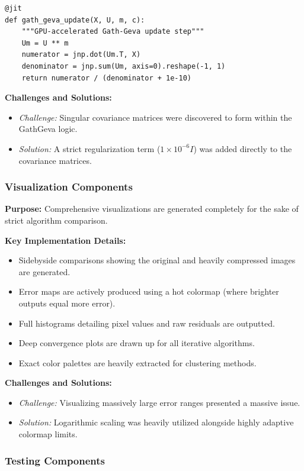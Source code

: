 \begin{verbatim}
@jit
def gath_geva_update(X, U, m, c):
    """GPU-accelerated Gath-Geva update step"""
    Um = U ** m
    numerator = jnp.dot(Um.T, X)
    denominator = jnp.sum(Um, axis=0).reshape(-1, 1)
    return numerator / (denominator + 1e-10)
\end{verbatim}

\textbf{Challenges and Solutions:}
\begin{itemize}
    \item \textit{Challenge:} Singular covariance matrices were discovered to form within the GathGeva logic.
    \item \textit{Solution:} A strict regularization term ($1\times10^{-6}I$) was added directly to the covariance matrices.
\end{itemize}

\subsubsection{Visualization Components}

\textbf{Purpose:} Comprehensive visualizations are generated completely for the sake of strict algorithm comparison.

\textbf{Key Implementation Details:}
\begin{itemize}
    \item Sidebyside comparisons showing the original and heavily compressed images are generated.
    \item Error maps are actively produced using a hot colormap (where brighter outputs equal more error).
    \item Full histograms detailing pixel values and raw residuals are outputted.
    \item Deep convergence plots are drawn up for all iterative algorithms.
    \item Exact color palettes are heavily extracted for clustering methods.
\end{itemize}

\textbf{Challenges and Solutions:}
\begin{itemize}
    \item \textit{Challenge:} Visualizing massively large error ranges presented a massive issue.
    \item \textit{Solution:} Logarithmic scaling was heavily utilized alongside highly adaptive colormap limits.
\end{itemize}

\subsubsection{Testing Components}

